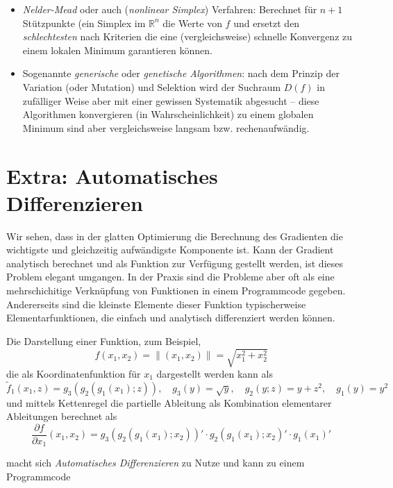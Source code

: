 \documentclass[]{book}
\providecommand{\tightlist}{%
  \setlength{\itemsep}{0pt}\setlength{\parskip}{0pt}}
\theoremstyle{definition}
\theoremstyle{definition}
\theoremstyle{definition}
\theoremstyle{definition}
\theoremstyle{remark}
\begin{document}
\begin{itemize}
\tightlist
\item
  \emph{Nelder-Mead} oder auch (\emph{nonlinear Simplex}) Verfahren: Berechnet für \(n+1\) Stützpunkte (ein Simplex im \(\mathbb R^{n}\) die Werte von \(f\) und ersetzt den \emph{schlechtesten} nach Kriterien die eine (vergleichsweise) schnelle Konvergenz zu einem lokalen Minimum garantieren können.
\item
  Sogenannte \emph{generische} oder \emph{genetische Algorithmen}: nach dem Prinzip der Variation (oder Mutation) und Selektion wird der Suchraum \(D(f)\) in zufälliger Weise aber mit einer gewissen Systematik abgesucht -- diese Algorithmen konvergieren (in Wahrscheinlichkeit) zu einem globalen Minimum sind aber vergleichsweise langsam bzw. rechenaufwändig.
\end{itemize}

\hypertarget{extra-automatisches-differenzieren}{%
\section{Extra: Automatisches Differenzieren}\label{extra-automatisches-differenzieren}}

Wir sehen, dass in der glatten Optimierung die Berechnung des Gradienten die wichtigste und gleichzeitig aufwändigste Komponente ist. Kann der Gradient analytisch berechnet und als Funktion zur Verfügung gestellt werden, ist dieses Problem elegant umgangen. In der Praxis sind die Probleme aber oft als eine mehrschichitige Verknüpfung von Funktionen in einem Programmcode gegeben. Andererseits sind die kleinste Elemente dieser Funktion typischerweise Elementarfunktionen, die einfach und analytisch differenziert werden können.

Die Darstellung einer Funktion, zum Beispiel,
\begin{equation*}
f(x_1, x_2) = \|(x_1, x_2)\| = \sqrt{x_1^2 + x_2^2}
\end{equation*}
die als Koordinatenfunktion für \(x_1\) dargestellt werden kann als
\[
\tilde f_1(x_1, z) = g_3(g_2(g_1(x_1); z)), \quad g_3(y) = \sqrt y, \quad g_2(y;z) = y + z^2, \quad g_1(y) = y^2
\]
und mittels Kettenregel die partielle Ableitung als Kombination elementarer Ableitungen berechnet als
\begin{equation*}
\frac{\partial f}{\partial x_1}(x_1,x_2) = g_3(g_2(g_1(x_1); x_2))'\cdot g_2(g_1(x_1); x_2)'\cdot g_1(x_1)'
\end{equation*}

macht sich \emph{Automatisches Differenzieren} zu Nutze und kann zu einem Programmcode
\end{document}
